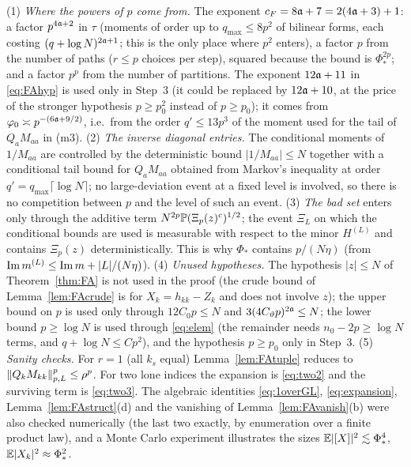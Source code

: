 \begin{remark}\label{rem:FAcheck}
(1) \emph{Where the powers of $p$ come from.} The exponent $c_F=8\mathfrak{a}+7=2(4\mathfrak{a}+3)+1$: a factor $p^{4\mathfrak{a}+2}$ in $\tau$ (moments of order up to $q_{\max}\le8p^2$ of bilinear forms, each costing $(q+\log N)^{2\mathfrak{a}+1}$; this is the only place where $p^2$ enters),
a factor $p$ from the number of paths ($r\le p$ choices per step), squared because the bound is $\Phi_*^{2p}$; and a factor $p^p$ from the number of partitions. The exponent $12\mathfrak{a}+11$ in \eqref{eq:FAhyp} is used only in Step~3 (it could be replaced by $12\mathfrak{a}+10$, at the price of the stronger hypothesis $p\ge p_0^2$ instead of $p\ge p_0$); it comes from
$\varphi_0\asymp p^{-(6\mathfrak{a}+9/2)}$, i.e.\ from the order $q'\le13p^3$ of the moment used for the tail of $Q_aM_{aa}$ in (m3).
(2) \emph{The inverse diagonal entries.} The conditional moments of $1/M_{aa}$ are controlled by the deterministic bound $|1/M_{aa}|\le N$ together with a conditional tail bound for $Q_aM_{aa}$ obtained from Markov's inequality at order $q'=q_{\max}\lceil\log N\rceil$; no large-deviation event at a fixed level is involved, so there is no competition between $p$ and the level of such an event.
(3) \emph{The bad set} enters only through the additive term $N^{2p}\mathbb{P}(\Xi_p(z)^c)^{1/2}$; the event $\Xi_L$ on which the conditional bounds are used is measurable with respect to the minor $H^{(L)}$ and contains $\Xi_p(z)$ deterministically. This is why $\Phi_*$ contains $p/(N\eta)$ (from $\operatorname{Im} m^{(L)}\le\operatorname{Im} m+|L|/(N\eta)$).
(4) \emph{Unused hypotheses.} The hypothesis $|z|\le N$ of Theorem~\ref{thm:FA} is not used in the proof (the crude bound of Lemma~\ref{lem:FAcrude} is for $X_k=h_{kk}-Z_k$ and does not involve $z$); the upper bound on $p$ is used only through $12C_0p\le N$ and $3(4C_\vartheta p)^{2\mathfrak{a}}\le N$; the lower bound $p\ge\log N$ is used through \eqref{eq:elem} (the remainder needs $n_0-2p\ge\log N$ terms, and $q+\log N\le Cp^2$), and the hypothesis $p\ge p_0$ only in Step~3.
(5) \emph{Sanity checks.} For $r=1$ (all $k_s$ equal) Lemma~\ref{lem:FAtuple} reduces to $\|Q_kM_{kk}\|_{p,L}^p\le\rho^p$. For two lone indices the expansion is \eqref{eq:two2} and the surviving term is \eqref{eq:two3}.
The algebraic identities \eqref{eq:1overGL}, \eqref{eq:expansion}, Lemma~\ref{lem:FAstruct}(d) and the vanishing of Lemma~\ref{lem:FAvanish}(b) were also checked numerically (the last two exactly, by enumeration over a finite product law), and a Monte Carlo experiment illustrates the sizes $\mathbb{E}|[X]|^2\lesssim\Phi_*^4$, $\mathbb{E}|X_k|^2\approx\Phi_*^2$.
\end{remark}

